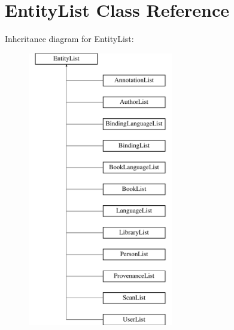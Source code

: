 \hypertarget{classEntityList}{
\section{EntityList Class Reference}
\label{classEntityList}
}
Inheritance diagram for EntityList:\begin{figure}[H]
\begin{center}
\leavevmode
\includegraphics[height=12.000000cm]{classEntityList}
\end{center}
\end{figure}
